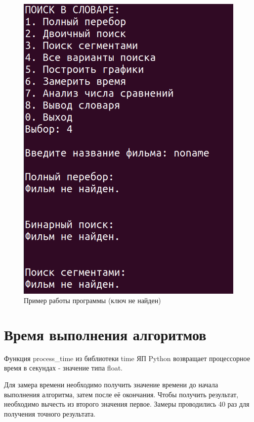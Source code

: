 \begin{figure}[H]
	\begin{center}
		\includegraphics[scale=0.3]{img/example-no.png}
	\end{center}
	\captionsetup{justification=centering}
	\caption{Пример работы программы (ключ не найден)}
	\label{img:example-no}
\end{figure}

\section{Время выполнения алгоритмов}

Функция process\_time из библиотеки time ЯП Python возвращает  процессорное время в секундах - значение типа float.

Для замера времени необходимо получить значение времени до начала выполнения алгоритма, затем после её окончания. Чтобы получить результат, необходимо вычесть из второго значения первое. Замеры проводились 40 раз для получения точного результата.

